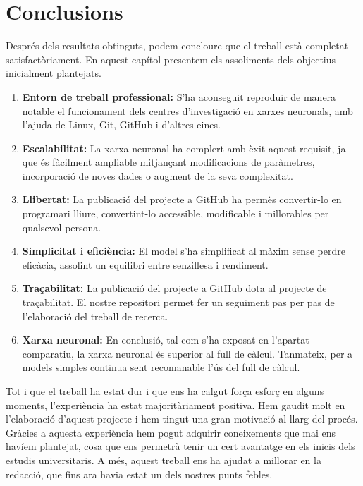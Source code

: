 \chapter{Conclusions}

\label{c:conclusions}

Després dels resultats obtinguts, podem concloure que el treball està completat satisfactòriament. En aquest capítol presentem els assoliments dels objectius inicialment plantejats.

\begin{enumerate}

     \item \textbf{Entorn de treball professional: } S’ha aconseguit reproduir de manera notable el funcionament dels centres d’investigació en xarxes neuronals, amb l'ajuda de Linux, Git, GitHub i d'altres eines.

     \item \textbf{Escalabilitat: } La xarxa neuronal ha complert amb èxit aquest requisit, ja que és fàcilment ampliable mitjançant modificacions de paràmetres, incorporació de noves dades o augment de la seva complexitat.

     \item \textbf{Llibertat: } La publicació del projecte a GitHub ha permès convertir-lo en programari lliure, convertint-lo accessible, modificable i millorables per qualsevol persona.

     \item \textbf{Simplicitat i eficiència: } El model s’ha simplificat al màxim sense perdre eficàcia, assolint un equilibri entre senzillesa i rendiment.

     \item \textbf{Traçabilitat: } La publicació del projecte a GitHub dota al projecte de traçabilitat. El nostre repositori permet fer un seguiment pas per pas de l'elaboració del treball de recerca.

     \item \textbf{Xarxa neuronal: } En conclusió, tal com s’ha exposat en l’apartat comparatiu, la xarxa neuronal és superior al full de càlcul. Tanmateix, per a models simples continua sent recomanable l’ús del full de càlcul.

\end{enumerate}

Tot i que el treball ha estat dur i que ens ha calgut força esforç en alguns moments, l’experiència ha estat majoritàriament positiva. Hem gaudit molt en l’elaboració d’aquest projecte i hem tingut una gran motivació al llarg del procés. Gràcies a aquesta experiència hem pogut adquirir coneixements que mai ens havíem plantejat, cosa que ens permetrà tenir un cert avantatge en els inicis dels estudis universitaris. A més, aquest treball ens ha ajudat a millorar en la redacció, que fins ara havia estat un dels nostres punts febles.

